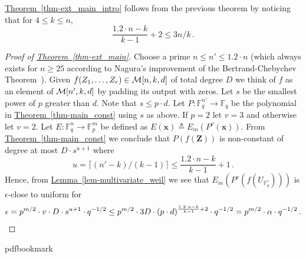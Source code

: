\documentclass[10pt]{article}
\theoremstyle{definition}
\numberwithin{equation}{section}
\newcommand{\expref}[2]{\texorpdfstring{\hyperref[#2]{#1~\ref{#2}}}{#1~\ref{#2}}}
\newcommand{\eps}{\epsilon}
\newcommand{\F}{\mathbb F_q}
\newcommand{\M}[3]{{\cal M}[#1,#2,#3]}
\newcommand{\x}{\textbf{x}}
\newcommand{\zi}{\textbf{Z}}
\begin{document}
\expref{Theorem}{thm-ext_main_intro} follows
from the previous theorem by noticing that for $4\leq k \leq n$,
\[\frac{1.2\cdot n-k}{k-1} +2 \leq 3n/k\,.\]

\begin{proof}[Proof of \expref{Theorem}{thm-ext_main}]
Choose a prime $n\leq n'\leq 1.2\cdot n$ (which always exists for $n\geq 25 $ according to Nagura's improvement of the
Bertrand-Chebychev Theorem~\cite{Na52}).
Given $f(Z_1,\ldots,Z_r)\in \M{n}{k}{d}$ of total degree $D$ we think of $f$ as an element of $ \M{n'}{k}{d}$
by padding its output with zeros.
Let $s$ be the smallest power of $p$ greater than $d$.
Note that $s\leq p\cdot d$.
Let $P:\F^{n'}\to \F$ be the polynomial in \expref{Theorem}{thm-main_const} using $s$ as above.
If $p=2$ let $v=3$ and otherwise let $v=2$.
Let $E:\F^n\to \mathbb{F}_p^m$ be defined as $E(\x)\triangleq E_m(P^v(\x))$.
{}From \expref{Theorem}{thm-main_const} we conclude that $P(f(\zi))$ is non-constant of degree at most $D\cdot s^{u+1}$
where 
\[
u= \lceil (n'-k)/(k-1)\rceil \leq  \frac{ 1.2\cdot n-k}{k-1} + 1\,.
\]
Hence, from \expref{Lemma}{lem-multivariate_weil} we see that $E_m(P^v(f(U_{\F^r})))$ is $\eps$-close to uniform
for
\[\eps = p^{m/2}\cdot v\cdot D\cdot s^{u+1}\cdot q^{-1/2}\leq
p^{m/2}\cdot 3 D \cdot (p\cdot d)^{\frac{1.2\cdot n-k}{k-1} +2}\cdot q^{-1/2}
=p^{m/2}\cdot \alpha\cdot q^{-1/2}\,.\qedhere\]
\end{proof}
\clearpage
\begingroup\raggedright
%
%
%
%
%
\providecommand{\bibhead}[1]{}
%
\expandafter\ifx\csname pdfbookmark\endcsname\relax%
  \providecommand{\tocrefpdfbookmark}{}
\else\providecommand{\tocrefpdfbookmark}{%
   \hypertarget{tocreferences}{}%
   \pdfbookmark[1]{References}{tocreferences}}%
\fi
\end{document}
